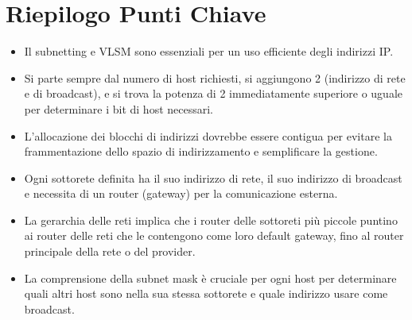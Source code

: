 \newpage
\section{Riepilogo Punti Chiave}
\begin{itemize}
    \item Il subnetting e VLSM sono essenziali per un uso efficiente degli indirizzi IP.
    \item Si parte sempre dal numero di host richiesti, si aggiungono 2 (indirizzo di rete e di broadcast), e si trova la potenza di 2 immediatamente superiore o uguale per determinare i bit di host necessari.
    \item L'allocazione dei blocchi di indirizzi dovrebbe essere contigua per evitare la frammentazione dello spazio di indirizzamento e semplificare la gestione.
    \item Ogni sottorete definita ha il suo indirizzo di rete, il suo indirizzo di broadcast e necessita di un router (gateway) per la comunicazione esterna.
    \item La gerarchia delle reti implica che i router delle sottoreti più piccole puntino ai router delle reti che le contengono come loro default gateway, fino al router principale della rete o del provider.
    \item La comprensione della subnet mask è cruciale per ogni host per determinare quali altri host sono nella sua stessa sottorete e quale indirizzo usare come broadcast.
\end{itemize}

